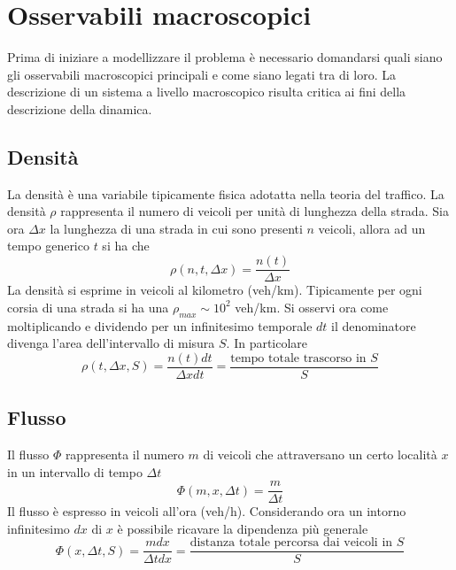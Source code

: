 \documentclass[../main.tex]{subfiles}
\begin{document}
\section{Osservabili macroscopici}
Prima di iniziare a modellizzare il problema \`e necessario domandarsi quali siano gli osservabili macroscopici principali e come siano legati tra di loro.
La descrizione di un sistema a livello macroscopico risulta critica ai fini della descrizione della dinamica.
\subsection{Densit\`a}
La densit\`a \`e una variabile tipicamente fisica adotatta nella teoria del traffico.
La densit\`a $\rho$ rappresenta il numero di veicoli per unit\`a di lunghezza della strada.
Sia ora $\Delta x$ la lunghezza di una strada in cui sono presenti $n$ veicoli, allora ad un tempo generico $t$ si ha che
\begin{equation*}
    \rho(n,t,\Delta x)=\frac{n(t)}{\Delta x}
\end{equation*}
La densit\`a si esprime in veicoli al kilometro (veh/km).
Tipicamente per ogni corsia di una strada si ha una $\rho_{max}\sim 10^2$ veh/km.
Si osservi ora come moltiplicando e dividendo per un infinitesimo temporale $dt$ il denominatore divenga l'area dell'intervallo di misura $S$.
In particolare
\begin{equation}
    \rho(t,\Delta x, S)=\frac{n(t)dt}{\Delta x dt}=\frac{\mbox{tempo totale trascorso in }S}{S}
    \label{eq:rho_s}
\end{equation}

\subsection{Flusso}
Il flusso $\Phi$ rappresenta il numero $m$ di veicoli che attraversano un certo localit\`a $x$ in un intervallo di tempo $\Delta t$
\begin{equation}
    \Phi(m, x, \Delta t)=\frac{m}{\Delta t}
\end{equation}
Il flusso \`e espresso in veicoli all'ora (veh/h).
Considerando ora un intorno infinitesimo $dx$ di $x$ \`e possibile ricavare la dipendenza più generale
\begin{equation}
    \Phi(x, \Delta t, S)=\frac{mdx}{\Delta t dx}=\frac{\mbox{distanza totale percorsa dai veicoli in }S}{S}
    \label{eq:phi_s}
\end{equation}
\end{document}
